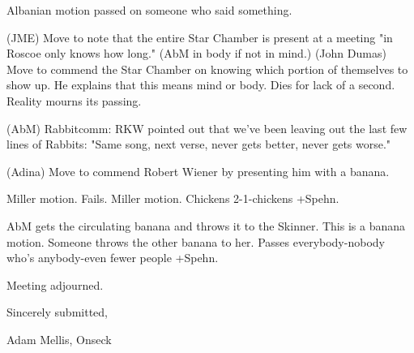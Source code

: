 \documentclass[12pt]{article}
\begin{document}
Albanian motion passed on someone who said something.

(JME) Move to note that the entire Star Chamber is present at a meeting "in Roscoe only knows how long." (AbM in body if not in mind.) (John Dumas) Move to commend the Star Chamber on knowing which portion of themselves to show up. He explains that this means mind or body. Dies for lack of a second. Reality mourns its passing.

(AbM) Rabbitcomm: RKW pointed out that we've been leaving out the last few lines of Rabbits: "Same song, next verse, never gets better, never gets worse."

(Adina) Move to commend Robert Wiener by presenting him with a banana.

Miller motion. Fails. Miller motion. Chickens 2-1-chickens +Spehn.

AbM gets the circulating banana and throws it to the Skinner. This is a banana motion. Someone throws the other banana to her. Passes everybody-nobody who's anybody-even fewer people +Spehn.

\vspace{12pt}

\noindent
Meeting adjourned.

\vspace{18pt}

\centerline{Sincerely submitted,}
\centerline{Adam Mellis, Onseck}
\end{document}
